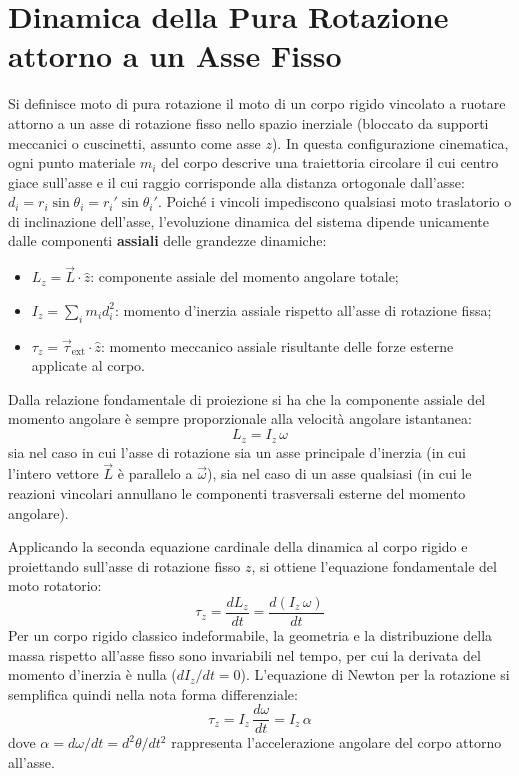 \section{Dinamica della Pura Rotazione attorno a un Asse Fisso}
Si definisce moto di pura rotazione il moto di un corpo rigido vincolato a ruotare attorno a un asse di rotazione fisso nello spazio inerziale (bloccato da supporti meccanici o cuscinetti, assunto come asse $z$). 
In questa configurazione cinematica, ogni punto materiale $m_i$ del corpo descrive una traiettoria circolare il cui centro giace sull'asse e il cui raggio corrisponde alla distanza ortogonale dall'asse: $d_i = r_i \sin\theta_i = r_i' \sin\theta_i'$. Poiché i vincoli impediscono qualsiasi moto traslatorio o di inclinazione dell'asse, l'evoluzione dinamica del sistema dipende unicamente dalle componenti \textbf{assiali} delle grandezze dinamiche:
\begin{itemize}
    \item $L_z = \vec{L} \cdot \hat{z}$: componente assiale del momento angolare totale;
    \item $I_z = \sum_i m_i d_i^2$: momento d'inerzia assiale rispetto all'asse di rotazione fissa;
    \item $\tau_z = \vec{\tau}_{\text{ext}} \cdot \hat{z}$: momento meccanico assiale risultante delle forze esterne applicate al corpo.
\end{itemize}

Dalla relazione fondamentale di proiezione si ha che la componente assiale del momento angolare è sempre proporzionale alla velocità angolare istantanea:
\begin{equation}
    L_z = I_z \, \omega
\end{equation}
sia nel caso in cui l'asse di rotazione sia un asse principale d'inerzia (in cui l'intero vettore $\vec{L}$ è parallelo a $\vec{\omega}$), sia nel caso di un asse qualsiasi (in cui le reazioni vincolari annullano le componenti trasversali esterne del momento angolare).

Applicando la seconda equazione cardinale della dinamica al corpo rigido e proiettando sull'asse di rotazione fisso $z$, si ottiene l'equazione fondamentale del moto rotatorio:
\begin{equation}
    \tau_z = \frac{d L_z}{dt} = \frac{d(I_z \, \omega)}{dt}
\end{equation}
Per un corpo rigido classico indeformabile, la geometria e la distribuzione della massa rispetto all'asse fisso sono invariabili nel tempo, per cui la derivata del momento d'inerzia è nulla ($dI_z/dt = 0$). L'equazione di Newton per la rotazione si semplifica quindi nella nota forma differenziale:
\begin{equation}
    \tau_z = I_z \, \frac{d\omega}{dt} = I_z \, \alpha
\end{equation}
dove $\alpha = d\omega/dt = d^2\theta/dt^2$ rappresenta l'accelerazione angolare del corpo attorno all'asse.

